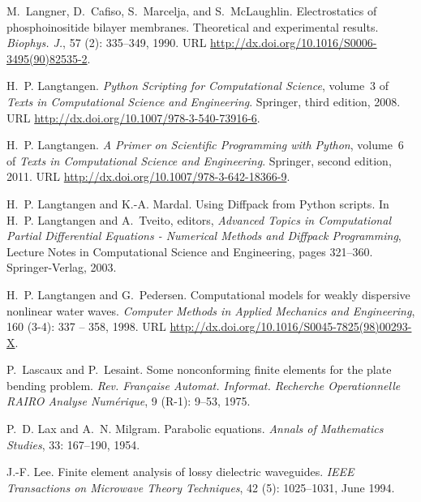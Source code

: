 \begin{thebibliography}{467}
M.~Langner, D.~Cafiso, S.~Marcelja, and S.~McLaughlin.
\newblock Electrostatics of phosphoinositide bilayer membranes. {T}heoretical
  and experimental results.
\newblock \emph{Biophys. J.}, 57 (2): 335--349, 1990.
\newblock URL \url{http://dx.doi.org/10.1016/S0006-3495(90)82535-2}.

H.~P. Langtangen.
\newblock \emph{Python Scripting for Computational Science}, volume~3 of
  \emph{Texts in Computational Science and Engineering}.
\newblock Springer, third edition, 2008.
\newblock URL \url{http://dx.doi.org/10.1007/978-3-540-73916-6}.

H.~P. Langtangen.
\newblock \emph{A Primer on Scientific Programming with Python}, volume~6 of
  \emph{Texts in Computational Science and Engineering}.
\newblock Springer, second edition, 2011.
\newblock URL \url{http://dx.doi.org/10.1007/978-3-642-18366-9}.

H.~P. Langtangen and K.-A. Mardal.
\newblock Using {D}iffpack from {P}ython scripts.
\newblock In H.~P. Langtangen and A.~Tveito, editors, \emph{Advanced Topics in
  Computational Partial Differential Equations - Numerical Methods and Diffpack
  Programming}, Lecture Notes in Computational Science and Engineering, pages
  321--360. Springer-Verlag, 2003.

H.~P. Langtangen and G.~Pedersen.
\newblock Computational models for weakly dispersive nonlinear water waves.
\newblock \emph{Computer Methods in Applied Mechanics and Engineering},
  160 (3-4): 337 -- 358, 1998.
\newblock URL \url{http://dx.doi.org/10.1016/S0045-7825(98)00293-X}.

P.~Lascaux and P.~Lesaint.
\newblock Some nonconforming finite elements for the plate bending problem.
\newblock \emph{Rev. Fran\c caise Automat. Informat. Recherche Operationnelle
  RAIRO Analyse Num\'erique}, 9 (R-1): 9--53, 1975.

P.~D. Lax and A.~N. Milgram.
\newblock Parabolic equations.
\newblock \emph{Annals of Mathematics Studies}, 33: 167--190, 1954.

J.-F. Lee.
\newblock Finite element analysis of lossy dielectric waveguides.
\newblock \emph{IEEE Transactions on Microwave Theory Techniques}, 42
  (5): 1025--1031, June 1994.


\end{thebibliography}
